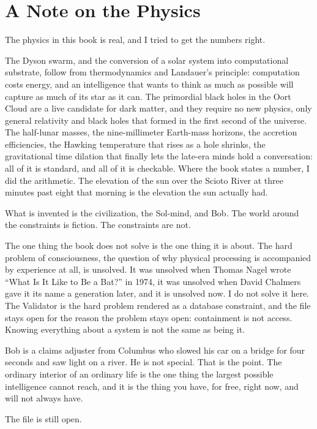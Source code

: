 \chapter*{A Note on the Physics}

The physics in this book is real, and I tried to get the numbers right.

The Dyson swarm, and the conversion of a solar system into computational substrate, follow from thermodynamics and Landauer's principle: computation costs energy, and an intelligence that wants to think as much as possible will capture as much of its star as it can. The primordial black holes in the Oort Cloud are a live candidate for dark matter, and they require no new physics, only general relativity and black holes that formed in the first second of the universe. The half-lunar masses, the nine-millimeter Earth-mass horizons, the accretion efficiencies, the Hawking temperature that rises as a hole shrinks, the gravitational time dilation that finally lets the late-era minds hold a conversation: all of it is standard, and all of it is checkable. Where the book states a number, I did the arithmetic. The elevation of the sun over the Scioto River at three minutes past eight that morning is the elevation the sun actually had.

What is invented is the civilization, the Sol-mind, and Bob. The world around the constraints is fiction. The constraints are not.

The one thing the book does not solve is the one thing it is about. The hard problem of consciousness, the question of why physical processing is accompanied by experience at all, is unsolved. It was unsolved when Thomas Nagel wrote ``What Is It Like to Be a Bat?'' in 1974, it was unsolved when David Chalmers gave it its name a generation later, and it is unsolved now. I do not solve it here. The Validator is the hard problem rendered as a database constraint, and the file stays open for the reason the problem stays open: containment is not access. Knowing everything about a system is not the same as being it.

Bob is a claims adjuster from Columbus who slowed his car on a bridge for four seconds and saw light on a river. He is not special. That is the point. The ordinary interior of an ordinary life is the one thing the largest possible intelligence cannot reach, and it is the thing you have, for free, right now, and will not always have.

The file is still open.
